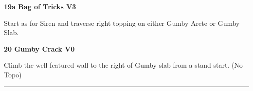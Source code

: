 \begin{multicols}{2}
\begin{adjustwidth}{0.5cm}{}
							\begin{minipage}{\linewidth}	
							\label{vr:Bag of Tricks}
\colorbox{green!20}{
\textbf{
19a Bag of Tricks V3   
}
}

							\begin{adjustwidth}{0.5cm}{}				
							Start as for Siren and traverse right topping on either Gumby Arete or Gumby Slab.
							\end{adjustwidth}
							\end{minipage}
						\end{adjustwidth}
					\begin{minipage}{\linewidth}	
					\label{rt:Gumby Crack}
\colorbox{green!20}{
\textbf{
20 Gumby Crack V0    
}
}

					\begin{adjustwidth}{0.5cm}{}				
					Climb the well featured wall to the right of Gumby slab from a stand start.
						\newline (No Topo) 
					\end{adjustwidth}
					\end{minipage}
\end{multicols}
\rule{\textwidth}{1pt}
